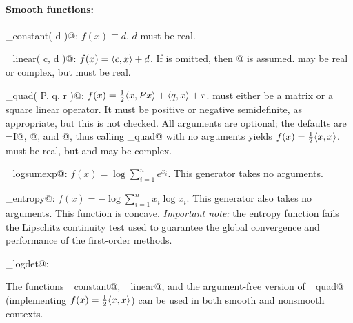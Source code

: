 \documentclass{article}
\begin{document}
\paragraph{Smooth functions:}
\begin{trivlist}
\item \verb@smooth_constant( d )@: $f(x)\equiv d$. $d$ must be real.
\item \verb@smooth_linear( c, d )@: $f(x)=\langle c,x\rangle+d$. If \verb@d@
is omitted, then @ is assumed. \verb@c@ may be real or complex,
but \verb@d@ must be real.
\item \verb@smooth_quad( P, q, r )@: $f(x)={\textstyle\frac{1}{2}} \langle x,Px\rangle+\langle q,x\rangle+r$. 
\verb@P@ must either be a matrix or a square linear operator. It must
be  positive or negative semidefinite, as appropriate, but this is not checked.
All arguments are optional; the defaults are \verb@P=I@, @, and @, thus
calling \verb@smooth_quad@ with no arguments yields $f(x)={\textstyle\frac{1}{2}}\langle x,x\rangle$.
\verb@r@ must be real, but \verb@P@ and \verb@q@ may be complex.
\item \verb@smooth_logsumexp@: $f(x)=\log\sum_{i=1}^n e^{x_i}$. This generator
takes no arguments.
\item \verb@smooth_entropy@: $f(x)=-\log\sum_{i=1}^n x_i\log x_i$. This generator
also takes no arguments. This function is concave. \emph{Important note:} the entropy
function fails the Lipschitz continuity test used to guarantee the global convergence and 
performance of the first-order methods.
\item \verb@smooth_logdet@: 
\end{trivlist}
The functions \verb@smooth_constant@, \verb@smooth_linear@, and the
argument-free version of \verb@smooth_quad@ (implementing $f(x)={\textstyle\frac{1}{2}}\langle x,x\rangle$)
can be used in both smooth and nonsmooth contexts.
\end{document}
